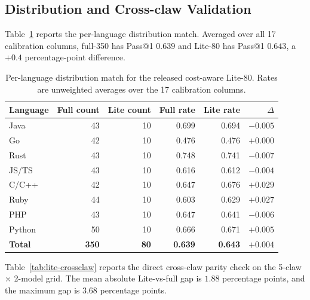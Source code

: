 \documentclass{llmxive}
\begin{document}
\subsection{Distribution and Cross-claw Validation}

Table~\ref{tab:lite-perlang} reports the per-language distribution
match.  Averaged over all 17 calibration columns, full-350 has Pass@1
$0.639$ and Lite-80 has Pass@1 $0.643$, a $+0.4$ percentage-point
difference.

\begin{table}[!htbp]
\centering
\small
\begin{tabular}{lrrrrr}
\toprule
Language & Full count & Lite count & Full rate & Lite rate & $\Delta$ \\
\midrule
Java   & 43 & 10 & 0.699 & 0.694 & $-0.005$ \\
Go     & 42 & 10 & 0.476 & 0.476 & $+0.000$ \\
Rust   & 43 & 10 & 0.748 & 0.741 & $-0.007$ \\
JS/TS  & 43 & 10 & 0.616 & 0.612 & $-0.004$ \\
C/C++  & 42 & 10 & 0.647 & 0.676 & $+0.029$ \\
Ruby   & 44 & 10 & 0.603 & 0.629 & $+0.027$ \\
PHP    & 43 & 10 & 0.647 & 0.641 & $-0.006$ \\
Python & 50 & 10 & 0.666 & 0.671 & $+0.005$ \\
\midrule
\textbf{Total} & \textbf{350} & \textbf{80} & \textbf{0.639} & \textbf{0.643} & \textbf{$+0.004$} \\
\bottomrule
\end{tabular}
\caption{Per-language distribution match for the released cost-aware
Lite-80.  Rates are unweighted averages over the 17 calibration
columns.}
\label{tab:lite-perlang}
\end{table}

Table~\ref{tab:lite-crossclaw} reports the direct cross-claw parity
check on the 5-claw $\times$ 2-model grid.  The mean absolute Lite-vs-full
gap is $1.88$ percentage points, and the maximum gap is $3.68$ percentage
points.
\end{document}
